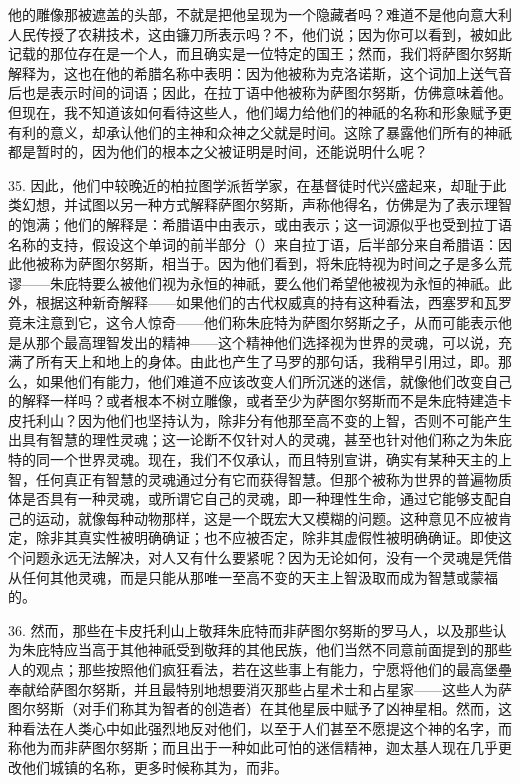 他的雕像那被遮盖的头部，不就是把他呈现为一个隐藏者吗？难道不是他向意大利人民传授了农耕技术，这由镰刀所表示吗？不，他们说；因为你可以看到，被如此记载的那位存在是一个人，而且确实是一位特定的国王；然而，我们将萨图尔努斯解释为，这也在他的希腊名称中表明：因为他被称为克洛诺斯，这个词加上送气音后也是表示时间的词语；因此，在拉丁语中他被称为萨图尔努斯，仿佛意味着他。但现在，我不知道该如何看待这些人，他们竭力给他们的神祇的名称和形象赋予更有利的意义，却承认他们的主神和众神之父就是时间。这除了暴露他们所有的神祇都是暂时的，因为他们的根本之父被证明是时间，还能说明什么呢？\par

35. 因此，他们中较晚近的柏拉图学派哲学家，在基督徒时代兴盛起来，却耻于此类幻想，并试图以另一种方式解释萨图尔努斯，声称他得名，仿佛是为了表示理智的饱满；他们的解释是：希腊语中由表示，或由表示；这一词源似乎也受到拉丁语名称的支持，假设这个单词的前半部分（）来自拉丁语，后半部分来自希腊语：因此他被称为萨图尔努斯，相当于。因为他们看到，将朱庇特视为时间之子是多么荒谬——朱庇特要么被他们视为永恒的神祇，要么他们希望他被视为永恒的神祇。此外，根据这种新奇解释——如果他们的古代权威真的持有这种看法，西塞罗和瓦罗竟未注意到它，这令人惊奇——他们称朱庇特为萨图尔努斯之子，从而可能表示他是从那个最高理智发出的精神——这个精神他们选择视为世界的灵魂，可以说，充满了所有天上和地上的身体。由此也产生了马罗的那句话，我稍早引用过，即。那么，如果他们有能力，他们难道不应该改变人们所沉迷的迷信，就像他们改变自己的解释一样吗？或者根本不树立雕像，或者至少为萨图尔努斯而不是朱庇特建造卡皮托利山？因为他们也坚持认为，除非分有他那至高不变的上智，否则不可能产生出具有智慧的理性灵魂；这一论断不仅针对人的灵魂，甚至也针对他们称之为朱庇特的同一个世界灵魂。现在，我们不仅承认，而且特别宣讲，确实有某种天主的上智，任何真正有智慧的灵魂通过分有它而获得智慧。但那个被称为世界的普遍物质体是否具有一种灵魂，或所谓它自己的灵魂，即一种理性生命，通过它能够支配自己的运动，就像每种动物那样，这是一个既宏大又模糊的问题。这种意见不应被肯定，除非其真实性被明确确证；也不应被否定，除非其虚假性被明确确证。即使这个问题永远无法解决，对人又有什么要紧呢？因为无论如何，没有一个灵魂是凭借从任何其他灵魂，而是只能从那唯一至高不变的天主上智汲取而成为智慧或蒙福的。\par

36. 然而，那些在卡皮托利山上敬拜朱庇特而非萨图尔努斯的罗马人，以及那些认为朱庇特应当高于其他神祇受到敬拜的其他民族，他们当然不同意前面提到的那些人的观点；那些按照他们疯狂看法，若在这些事上有能力，宁愿将他们的最高堡壘奉献给萨图尔努斯，并且最特别地想要消灭那些占星术士和占星家——这些人为萨图尔努斯（对手们称其为智者的创造者）在其他星辰中赋予了凶神星相。然而，这种看法在人类心中如此强烈地反对他们，以至于人们甚至不愿提这个神的名字，而称他为而非萨图尔努斯；而且出于一种如此可怕的迷信精神，迦太基人现在几乎更改他们城镇的名称，更多时候称其为，而非。\par

